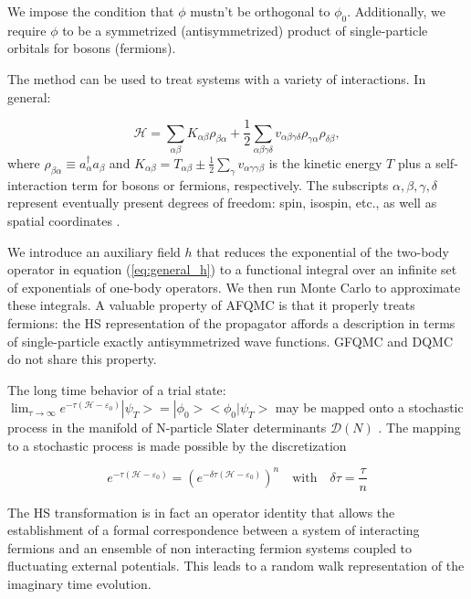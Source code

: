 We impose the condition that $\phi$ mustn't be orthogonal to $\phi_0$. Additionally, we require $\phi$ to be a symmetrized (antisymmetrized) product of single-particle orbitals for bosons (fermions).\par

The method can be used to treat systems with a variety of interactions. In general:

\begin{equation}\label{eq:general_h}
\mathcal{H} = \sum_{\alpha\beta} K_{\alpha\beta} \rho_{\beta\alpha} +\frac{1}{2} \sum_{\alpha\beta\gamma\delta} v_{\alpha\beta\gamma\delta} \rho_{\gamma\alpha} \rho_{\delta\beta} ,
\end{equation}
where $\rho_{\beta\alpha}\equiv a_\alpha^\dagger a_\beta$ and
$K_{\alpha\beta} = T_{\alpha\beta} \pm \frac{1}{2} \sum_{\gamma} v_{\alpha\gamma\gamma\beta}$
is the kinetic energy $T$ plus a self-interaction term for bosons or fermions, respectively. The subscripts ${\alpha, \beta, \gamma, \delta}$ represent eventually present degrees of freedom: spin, isospin, etc., as well as spatial coordinates \cite{sugiyama}.\par

We introduce an auxiliary field $h$ that reduces the exponential of the two-body operator in equation (\ref{eq:general_h}) to a functional integral over an infinite set of exponentials of one-body operators. We then run Monte Carlo to approximate these integrals. A valuable property of AFQMC is that it properly treats fermions: the HS representation of the propagator affords a description in terms of single-particle exactly antisymmetrized wave functions. GFQMC and DQMC do not share this property.\par

The long time behavior of a trial state: $\lim_{\tau \rightarrow \infty } e^{-\tau (\mathcal{H} - \varepsilon_0)} |\psi_T > = | \phi_0 > < \phi_0 | \psi_T >$ may be mapped onto a stochastic process in the manifold of N-particle Slater determinants $\mathcal{D}(N)$ \cite{zhang}. The mapping to a stochastic process is made possible by the discretization

\begin{equation}
e^{-\tau (\mathcal{H} - \varepsilon_0)} = (e^{-\delta \tau ( \mathcal{H} - \varepsilon_0 ) })^n \quad \text{with} \quad \delta \tau = \frac{\tau}{n}
\end{equation}

The HS transformation is in fact an operator identity that allows the establishment of a formal correspondence between a system of interacting fermions and an ensemble of non interacting fermion systems coupled to fluctuating external potentials. This leads to a random walk representation of the imaginary time evolution.\par

